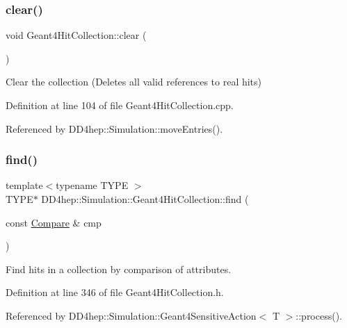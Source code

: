 \subsubsection{\texorpdfstring{clear()}{clear()}}
{\footnotesize\ttfamily void Geant4\+Hit\+Collection\+::clear (\begin{DoxyParamCaption}{ }\end{DoxyParamCaption})\hspace{0.3cm}{\ttfamily [virtual]}}



Clear the collection (Deletes all valid references to real hits) 



Definition at line 104 of file Geant4\+Hit\+Collection.\+cpp.



Referenced by D\+D4hep\+::\+Simulation\+::move\+Entries().

\hypertarget{class_d_d4hep_1_1_simulation_1_1_geant4_hit_collection_acf068dedd6941bee984bfd54fe17795f}{}\label{class_d_d4hep_1_1_simulation_1_1_geant4_hit_collection_acf068dedd6941bee984bfd54fe17795f} 
\subsubsection{\texorpdfstring{find()}{find()}}
{\footnotesize\ttfamily template$<$typename T\+Y\+PE $>$ \\
T\+Y\+PE$\ast$ D\+D4hep\+::\+Simulation\+::\+Geant4\+Hit\+Collection\+::find (\begin{DoxyParamCaption}\item[{const \hyperlink{class_d_d4hep_1_1_simulation_1_1_geant4_hit_collection_1_1_compare}{Compare} \&}]{cmp }\end{DoxyParamCaption})\hspace{0.3cm}{\ttfamily [inline]}}



Find hits in a collection by comparison of attributes. 



Definition at line 346 of file Geant4\+Hit\+Collection.\+h.



Referenced by D\+D4hep\+::\+Simulation\+::\+Geant4\+Sensitive\+Action$<$ T $>$\+::process().

